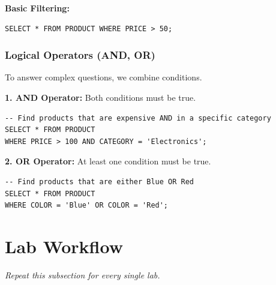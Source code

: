 \documentclass[12pt,a4paper]{article}
\begin{document}
\textbf{Basic Filtering:}
\begin{lstlisting}
SELECT * FROM PRODUCT WHERE PRICE > 50;
\end{lstlisting}

\subsubsection{Logical Operators (AND, OR)}
To answer complex questions, we combine conditions.

\textbf{1. AND Operator:}
Both conditions must be true.
\begin{lstlisting}
-- Find products that are expensive AND in a specific category
SELECT * FROM PRODUCT 
WHERE PRICE > 100 AND CATEGORY = 'Electronics';
\end{lstlisting}

\textbf{2. OR Operator:}
At least one condition must be true.
\begin{lstlisting}
-- Find products that are either Blue OR Red
SELECT * FROM PRODUCT 
WHERE COLOR = 'Blue' OR COLOR = 'Red';
\end{lstlisting}
\newpage
\section*{Lab Workflow}

\textit{Repeat this subsection for every single lab.}
\end{document}
